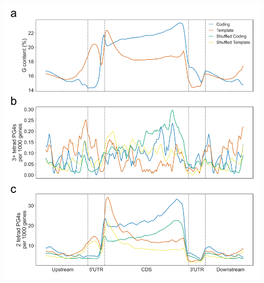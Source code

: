 \documentclass[12pt,a4paper,]{report}
\let\origfigure=\figure
\let\endorigfigure=\endfigure
\renewenvironment{figure}[1][2] {
    \expandafter\origfigure\expandafter[H]
} {
    \endorigfigure
}
\begin{document}
\newpage

\begin{figure}[htbp]
\centering
\includegraphics[width=\textwidth,height=562pt,keepaspectratio]{chapter_4/figures/gc_g4_content_metagene.png}
\caption[Metagene Profile of GC content and PG4 density]{\textbf{Metagene   Profile   of   GC   content   and   PG4   density}   Metagene   profiles   showing   the   \textbf{a)}   G   content,   \textbf{b)}   three   or   more   tetrad   PG4   content   and   \textbf{c)}   two   tetrad   PG4   content   of   protein   coding   genes   on   the   coding   (blue)   and   template   (orange)   strands.   Green   and   yellow   lines   show   the   average   coding   and   template   PG4   contents   for   genes   where   the   sequence   has   been   shuffled   in   20bp   windows,   maintaining   mononucleotide   and   dinucleotide   frequencies.   G   content   metaprofiles   are   identical   to   the   real   metaprofiles   in   these   shuffled   controls.   \label{metagene}}
\end{figure}
\end{document}
